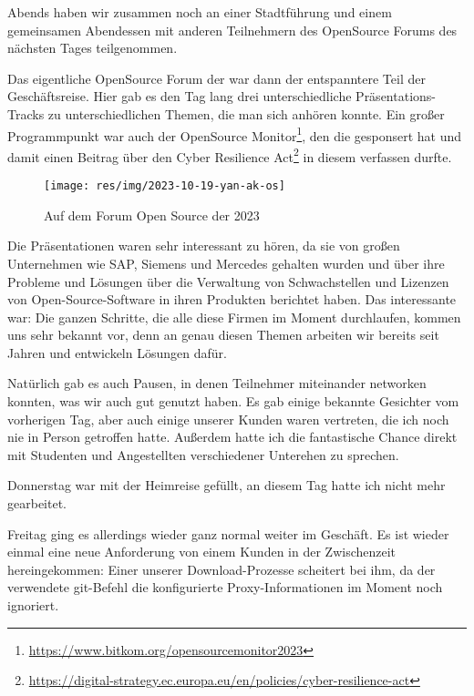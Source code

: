 Abends haben wir zusammen noch an einer Stadtführung und einem gemeinsamen Abendessen mit anderen Teilnehmern des OpenSource Forums des nächsten Tages teilgenommen.


Das eigentliche OpenSource Forum der {\bitkom} war dann der entspanntere Teil der Geschäftsreise.
Hier gab es den Tag lang drei unterschiedliche Präsentations-Tracks zu unterschiedlichen Themen, die man sich anhören konnte.
Ein großer Programmpunkt war auch der {\bitkom} OpenSource Monitor\footnote{\url{https://www.bitkom.org/opensourcemonitor2023}}, den die {\metaeffekt} gesponsert hat und damit einen Beitrag über den Cyber Resilience Act\footnote{\url{https://digital-strategy.ec.europa.eu/en/policies/cyber-resilience-act}} in diesem verfassen durfte.

\begin{figure}[htbp] %
    \centering
    \texttt{[image: res/img/2023-10-19-yan-ak-os]}
    \caption{Auf dem Forum Open Source der {\bitkom} 2023}
    \label{fig:yan-foss23}
\end{figure}

Die Präsentationen waren sehr interessant zu hören, da sie von großen Unternehmen wie SAP, Siemens und Mercedes gehalten wurden und über ihre Probleme und Lösungen über die Verwaltung von Schwachstellen und Lizenzen von Open-Source-Software in ihren Produkten berichtet haben.
Das interessante war: Die ganzen Schritte, die alle diese Firmen im Moment durchlaufen, kommen uns sehr bekannt vor, denn an genau diesen Themen arbeiten wir bereits seit Jahren und entwickeln Lösungen dafür.

Natürlich gab es auch Pausen, in denen Teilnehmer miteinander networken konnten, was wir auch gut genutzt haben.
Es gab einige bekannte Gesichter vom vorherigen Tag, aber auch einige unserer Kunden waren vertreten, die ich noch nie in Person getroffen hatte.
Außerdem hatte ich die fantastische Chance direkt mit Studenten und Angestellten verschiedener Unterehen zu sprechen.


Donnerstag war mit der Heimreise gefüllt, an diesem Tag hatte ich nicht mehr gearbeitet.

Freitag ging es allerdings wieder ganz normal weiter im Geschäft.
Es ist wieder einmal eine neue Anforderung von einem Kunden in der Zwischenzeit hereingekommen:
Einer unserer Download-Prozesse scheitert bei ihm, da der verwendete git-Befehl die konfigurierte Proxy-Informationen im Moment noch ignoriert.

